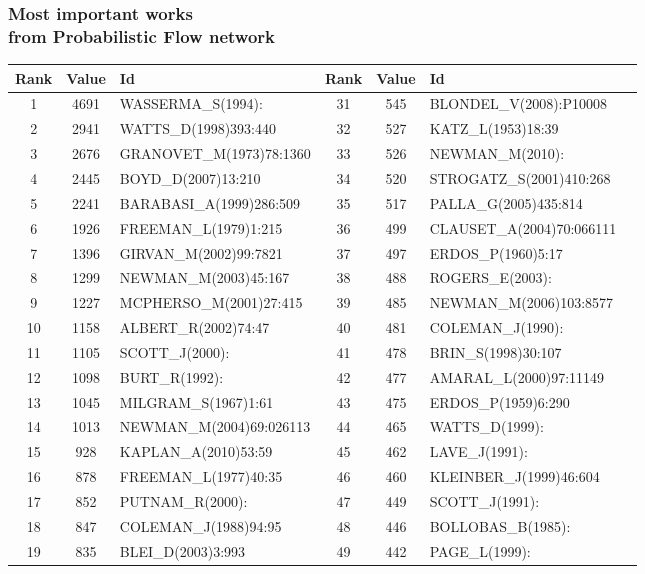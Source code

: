 \documentclass[hyperref={pdfstartview={FitBH -32768},
                         pdfpagemode=FullScreen,
                         plainpages=false,
                         colorlinks=true}
              ]{beamer}
\begin{document}
\begin{frame}[fragile]
\frametitle{Most important works \\ \normalsize from Probabilistic  Flow network}
\small

\renewcommand{\arraystretch}{0.82}
\tiny
\begin{tabular}{c|c|l||c|c|l|l}
Rank&   	Value&   	Id&   	Rank&   	Value&   	Id\\ \hline
1&   	4691&   	WASSERMA\_S(1994):&   	31&   	545&   	BLONDEL\_V(2008):P10008\\
2&   	2941&   	WATTS\_D(1998)393:440&   	32&   	527&   	KATZ\_L(1953)18:39\\
3&   	2676&   	GRANOVET\_M(1973)78:1360&   	33&   	526&   	NEWMAN\_M(2010):\\
4&   	2445&   	BOYD\_D(2007)13:210&   	34&   	520&   	STROGATZ\_S(2001)410:268\\
5&   	2241&   	BARABASI\_A(1999)286:509&   	35&   	517&   	PALLA\_G(2005)435:814\\
6&   	1926&   	FREEMAN\_L(1979)1:215&   	36&   	499&   	CLAUSET\_A(2004)70:066111\\
7&   	1396&   	GIRVAN\_M(2002)99:7821&   	37&   	497&   	ERDOS\_P(1960)5:17\\
8&   	1299&   	NEWMAN\_M(2003)45:167&   	38&   	488&   	ROGERS\_E(2003):\\
9&   	1227&   	MCPHERSO\_M(2001)27:415&   	39&   	485&   	NEWMAN\_M(2006)103:8577\\
10&   	1158&   	ALBERT\_R(2002)74:47&   	40&   	481&   	COLEMAN\_J(1990):\\
11&   	1105&   	SCOTT\_J(2000):&   	41&   	478&   	BRIN\_S(1998)30:107\\
12&   	1098&   	BURT\_R(1992):&   	42&   	477&   	AMARAL\_L(2000)97:11149\\
13&   	1045&   	MILGRAM\_S(1967)1:61&   	43&   	475&   	ERDOS\_P(1959)6:290\\
14&   	1013&   	NEWMAN\_M(2004)69:026113&   	44&   	465&   	WATTS\_D(1999):\\
15&   	928&   	KAPLAN\_A(2010)53:59&   	45&   	462&   	LAVE\_J(1991):\\
16&   	878&   	FREEMAN\_L(1977)40:35&   	46&   	460&   	KLEINBER\_J(1999)46:604\\
17&   	852&   	PUTNAM\_R(2000):&   	47&   	449&   	SCOTT\_J(1991):\\
18&   	847&   	COLEMAN\_J(1988)94:95&   	48&   	446&   	BOLLOBAS\_B(1985):\\
19&   	835&   	BLEI\_D(2003)3:993&   	49&   	442&   	PAGE\_L(1999):\\

\end{tabular}
\end{frame}
\end{document}
